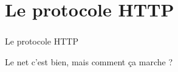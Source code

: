 

\section{Le protocole HTTP}
\begin{frame}\frametitle{}
    {\Huge Le protocole HTTP}

    \vspace{2em}

    Le net c'est bien, mais comment ça marche ?
\end{frame}
